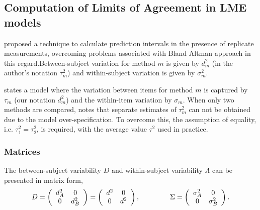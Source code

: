 \documentclass[12pt, a4paper]{report}
\theoremstyle{plain}
\theoremstyle{definition}
\theoremstyle{remark}
\begin{document}
%
%




\subsection{Computation of Limits of Agreement in LME models}


\citet{BXC2008} proposed a technique to calculate prediction intervals in the presence of replicate measurements, overcoming problems associated with Bland-Altman approach in this regard.Between-subject variation for method $m$ is given by $d^2_{m}$ (in the author's notation $\tau^2_m$) and within-subject variation is given by $\sigma^2_{m}$.  

\citet{BXC2008} states a model where the variation between items for method $m$ is captured by $\tau_m$ (our notation $d^2_m$) and the within-item variation by $\sigma_m$. When only two methods are compared, \citet{BXC2008} notes that separate estimates of $\tau^2_m$ can not be obtained due to the model over-specification. To overcome this, the assumption of equality, i.e. $\tau^2_1 = \tau^2_2$, is required, with the average value $\tau^2$ used in practice.

\subsubsection*{Matrices}
The between-subject variability ${D}$ and within-subject variability ${\Lambda}$ can be presented in matrix form,\[
{D} = \left(%
\begin{array}{cc}
d^2_{A}& 0 \\
0 & d^2_{B} \\
\end{array}%
\right)=\left(%
\begin{array}{cc}
d^2& 0 \\
0 & d^2\\
\end{array}%
\right),
\hspace{1.5cm}
{\Sigma} = \left(%
\begin{array}{cc}
\sigma^2_{A}& 0 \\
0 & \sigma^2_{B} \\
\end{array}%
\right).
\]
\end{document}
